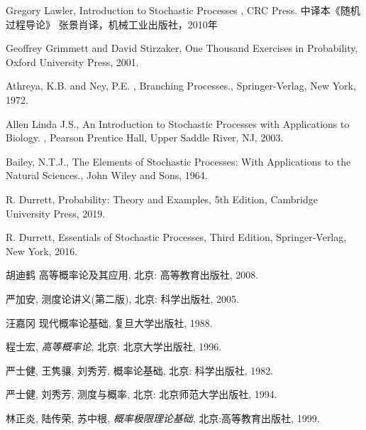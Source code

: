 \newcommand{\auth}[1]{\rm #1}
\newcommand{\refart}[1]{#1}
\newcommand{\refbook}[1]{\emph{#1}}
\newcommand{\journal}[1]{\emph{#1}}
%
\newcommand{\authc}[1]{{\song #1}}  %
\newcommand{\refartc}[1]{{\kai #1}}
\newcommand{\refbookc}[1]{{\kai #1}}
\newcommand{\journalc}[1]{{\song #1}}


\renewcommand{\leftmark}{参考文献}
\begin{thebibliography}{999}

\linespread{1.0}\selectfont

\auth{Gregory Lawler},
\refart{Introduction to Stochastic Processes} ,
CRC Press. 中译本《随机过程导论》  张景肖译，机械工业出版社，2010年

\auth{Geoffrey Grimmett and David Stirzaker},
\refart{One Thousand Exercises in Probability},
Oxford University Press, 2001.


\auth{Athreya, K.B. and Ney, P.E. },
\refart{Branching Processes.},
Springer-Verlag, New York, 1972.

\auth{Allen Linda J.S.},
\refart{An Introduction to Stochastic Processes with Applications to Biology. },
Pearson Prentice Hall, Upper Saddle River, NJ, 2003.

\auth{Bailey, N.T.J.},
\refart{ The Elements of Stochastic Processes: With Applications to the Natural Sciences.},
John Wiley and Sons, 1964.


\auth{R. Durrett},
\refart{Probability: Theory and Examples},
5th Edition, Cambridge University Press, 2019.

\auth{R. Durrett},
\refart{Essentials of Stochastic Processes},
Third Edition, Springer-Verlag, New York, 2016.


\auth{胡迪鹤}
\refart{高等概率论及其应用},
北京: 高等教育出版社, 2008.

\auth{严加安},
\refartc{测度论讲义}(第二版),
北京: 科学出版社, 2005.

\auth{汪嘉冈}
\refartc{现代概率论基础},
复旦大学出版社, 1988.

\auth{程士宏},
\refbook{高等概率论},
北京: 北京大学出版社, 1996.

\auth{严士健, 王隽骧, 刘秀芳},
\refartc{概率论基础},
北京: 科学出版社, 1982.

\auth{严士健, 刘秀芳},
\refartc{测度与概率},
北京: 北京师范大学出版社, 1994.

\auth{林正炎, 陆传荣, 苏中根},
\refbook{概率极限理论基础},
北京:高等教育出版社, 1999.


\end{thebibliography}

